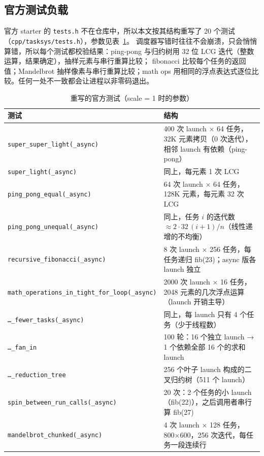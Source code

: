 \documentclass[11pt,a4paper]{ctexart}
\begin{document}
\subsection{官方测试负载}
\label{sec:tests}

官方 starter 的 \texttt{tests.h} 不在仓库中，所以本文按其结构重写了 20 个测试（\texttt{cpp/\allowbreak{}tasksys/\allowbreak{}tests.h}），参数见表~\ref{tab:tests}。
调度器写错时往往不会崩溃，只会悄悄算错，所以每个测试都校验结果：ping-pong 与归约树用 32 位 LCG 迭代（整数运算，结果确定），抽样元素与串行重算比较；
fibonacci 比较每个任务的返回值；Mandelbrot 抽样像素与串行重算比较；math ops 用相同的浮点表达式逐位比较。任何一处不一致都会让进程以非零码退出。

\begin{table}[H]
\centering
\caption{重写的官方测试（scale = 1 时的参数）}
\label{tab:tests}
\small
\begin{tabularx}{\linewidth}{>{\raggedright}p{5.2cm}X}
\toprule
测试 & 结构 \\
\midrule
\texttt{super\_\allowbreak{}super\_\allowbreak{}light(\_\allowbreak{}async)} & 400 次 launch × 64 任务，32K 元素拷贝（0 次迭代），相邻 launch 有依赖（ping-pong） \\
\texttt{super\_\allowbreak{}light(\_\allowbreak{}async)} & 同上，每元素 1 次 LCG \\
\texttt{ping\_\allowbreak{}pong\_\allowbreak{}equal(\_\allowbreak{}async)} & 64 次 launch × 64 任务，128K 元素，每元素 32 次 LCG \\
\texttt{ping\_\allowbreak{}pong\_\allowbreak{}unequal(\_\allowbreak{}async)} & 同上，任务 $i$ 的迭代数 $\approx 2\cdot 32\,(i+1)/n$（线性递增的不均衡） \\
\texttt{recursive\_\allowbreak{}fibonacci(\_\allowbreak{}async)} & 8 次 launch × 256 任务，每任务递归 fib(23)；async 版各 launch 独立 \\
\texttt{math\_\allowbreak{}operations\_\allowbreak{}in\_\allowbreak{}tight\_\allowbreak{}for\_\allowbreak{}loop(\_\allowbreak{}async)} & 2000 次 launch × 16 任务，2048 元素的几次浮点运算（launch 开销主导） \\
\texttt{\dots\_\allowbreak{}fewer\_\allowbreak{}tasks(\_\allowbreak{}async)} & 同上，每 launch 只有 4 个任务（少于线程数） \\
\texttt{\dots\_\allowbreak{}fan\_\allowbreak{}in} & 100 轮：16 个独立 launch → 1 个依赖全部 16 个的求和 launch \\
\texttt{\dots\_\allowbreak{}reduction\_\allowbreak{}tree} & 256 个叶子 launch 构成的二叉归约树（511 个 launch） \\
\texttt{spin\_\allowbreak{}between\_\allowbreak{}run\_\allowbreak{}calls(\_\allowbreak{}async)} & 20 次：2 个任务的小 launch（fib(22)），之后调用者串行算 fib(27) \\
\texttt{mandelbrot\_\allowbreak{}chunked(\_\allowbreak{}async)} & 4 次 launch × 128 任务，800×600，256 次迭代，每任务一段连续行 \\
\bottomrule
\end{tabularx}
\end{table}
\end{document}
